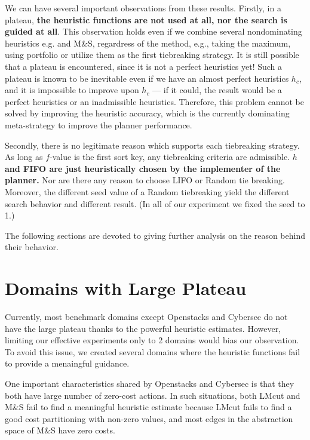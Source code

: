 We can have several important observations from these results.  Firstly, in a plateau, \textbf{the heuristic functions are not used at all, nor the search is guided at all}. This observation holds even if we combine several nondominating heuristics e.g. \lmcut and M\&S, regardress of the method, e.g., taking the maximum, using portfolio or utilize them as the first tiebreaking strategy. It is still possible that a plateau is encountered, since it is not a perfect heuristics yet!
Such a plateau is known to be inevitable even if we have an almost perfect heuristics $h_c$, and it is impossible to improve upon $h_c$ --- if it could, the result would be a perfect heuristics or an inadmissible heuristics. Therefore, this problem cannot be solved by improving the heuristic accuracy, which is the currently dominating meta-strategy to improve the planner performance.

Secondly, there is no legitimate reason which supports each tiebreaking strategy.
As long as $f$-value is the first sort key, any tiebreaking criteria are admissible. \textbf{$h$ and FIFO are just heuristically chosen by the implementer of the planner.} Nor are there any reason to choose LIFO or Random tie breaking. Moreover, the different seed value of a Random tiebreaking yield the different search behavior and different result. (In all of our experiment we fixed the seed to 1.)


The following sections are devoted to giving further analysis on the reason behind their behavior.

\section{Domains with Large Plateau}

Currently, most benchmark domains except Openstacks and Cybersec do not
have the large plateau thanks to the powerful heuristic
estimates. However, limiting our effective experiments only to 2 domains
would bias our observation. To avoid this issue, we created several
domains where the \sota heuristic functions fail to provide a
menaingful guidance.

One important characteristics shared by Openstacks and Cybersec is that they both
have large number of zero-cost actions. In such situations, both LMcut
and M\&S fail to find a meaningful heuristic estimate because LMcut fails to
find a good cost partitioning with non-zero values, and most edges in the abstraction space of
M\&S have zero costs.

